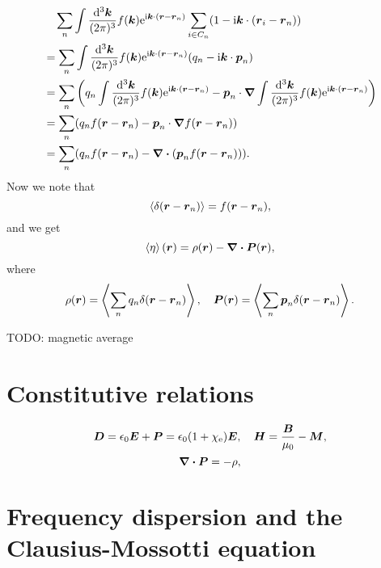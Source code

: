 \documentclass[hyperref, a4paper]{article}
\newcommand*{\ii}{\mathrm{i}}
\newcommand*{\ee}{\mathrm{e}}
\begin{document}
\[
    \begin{aligned}
        &\quad \sum_n \int \frac{\dd[3]{\vb*{k}}}{(2\pi)^3} f(\vb*{k}) \ee^{\ii \vb*{k} \cdot (\vb*{r} - \vb*{r}_n)} \sum_{i \in C_n} (1 - \ii \vb*{k} \cdot (\vb*{r}_i - \vb*{r}_n)) \\
        &= \sum_n \int \frac{\dd[3]{\vb*{k}}}{(2\pi)^3} f(\vb*{k}) \ee^{\ii \vb*{k} \cdot (\vb*{r} - \vb*{r}_n)} (q_n - \ii \vb*{k} \cdot \vb*{p}_n) \\
        &= \sum_n \left( q_n \int \frac{\dd[3]{\vb*{k}}}{(2\pi)^3} f(\vb*{k}) \ee^{\ii \vb*{k} \cdot (\vb*{r} - \vb*{r}_n)} - \vb*{p}_n \cdot \grad \int \frac{\dd[3]{\vb*{k}}}{(2\pi)^3} f(\vb*{k}) \ee^{\ii \vb*{k} \cdot (\vb*{r} - \vb*{r}_n)}  \right) \\
        &= \sum_n (q_n f(\vb*{r} - \vb*{r}_n) - \vb*{p}_n \cdot \grad f(\vb*{r} - \vb*{r}_n)) \\
        &= \sum_n (q_n f(\vb*{r} - \vb*{r}_n) - \div(\vb*{p}_n f(\vb*{r} - \vb*{r}_n))) .
    \end{aligned}
\]
Now we note that 
\[
    \expval{ \delta(\vb*{r} - \vb*{r}_n)} = f(\vb*{r} - \vb*{r}_n), 
\]
and we get 
\begin{equation}
    \expval{\eta}(\vb*{r}) = \rho(\vb*{r}) - \div{\vb*{P}(\vb*{r})},
\end{equation}
where 
\begin{equation}
    \rho(\vb*{r}) = \expval{\sum_n q_n \delta(\vb*{r} - \vb*{r}_n)}, \quad 
    \vb*{P}(\vb*{r}) = \expval{\sum_n \vb*{p}_n \delta(\vb*{r} - \vb*{r}_n)}   .
\end{equation}

TODO: magnetic average

\section{Constitutive relations}

\begin{equation}
    \vb*{D} = \epsilon_0 \vb*{E} + \vb*{P} = \epsilon_0 (1 + \chi_\text{e}) \vb*{E}, \quad 
    \vb*{H} = \frac{\vb*{B}}{\mu_0} - \vb*{M},
\end{equation}
\begin{equation}
    \div{\vb*{P}} = - \rho,
\end{equation}


\section{Frequency dispersion and the Clausius-Mossotti equation}
\end{document}
